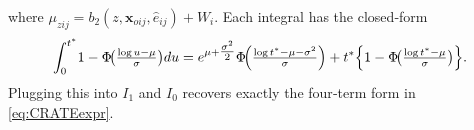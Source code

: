 \documentclass[aoas]{imsart}
\theoremstyle{plain}
\theoremstyle{definition}
\begin{document}
where \(\mu_{zij}=b_2(z,\mathbf{x}_{oij},\hat e_{ij})+W_i\).  Each integral has the closed‐form
\[
\int_{0}^{t^*}\!1 - \Phi\!\bigl(\tfrac{\log u - \mu}{\sigma}\bigr)du
= e^{\mu + \tfrac{\sigma^2}{2}}
  \Phi\!\Bigl(\tfrac{\log t^* - \mu - \sigma^2}{\sigma}\Bigr)
+ t^*\Bigl\{1-\Phi\!\bigl(\tfrac{\log t^* - \mu}{\sigma}\bigr)\Bigr\}.
\]
Plugging this into \(I_1\) and \(I_0\) recovers exactly the four‐term form in \eqref{eq:CRATEexpr}.

 

\end{document}
